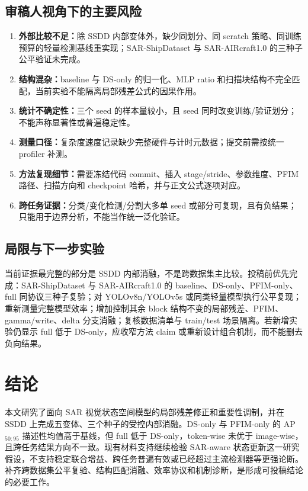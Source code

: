 \documentclass[UTF8,12pt,a4paper]{ctexart}
\begin{document}
\subsection{审稿人视角下的主要风险}
\begin{enumerate}
\item \textbf{外部比较不足：}除 SSDD 内部变体外，缺少同划分、同 scratch 策略、同训练预算的轻量检测基线重实现；SAR-ShipDataset 与 SAR-AIRcraft1.0 的三种子公平验证未完成。
\item \textbf{结构混杂：}baseline 与 DS-only 的归一化、MLP ratio 和扫描块结构不完全匹配，当前实验不能隔离局部残差公式的因果作用。
\item \textbf{统计不确定性：}三个 seed 的样本量较小，且 seed 同时改变训练/验证划分；不能声称显著性或普遍稳定性。
\item \textbf{测量口径：}复杂度速度记录缺少完整硬件与计时元数据；提交前需按统一 profiler 补测。
\item \textbf{方法复现细节：}需要冻结代码 commit、插入 stage/stride、参数维度、PFIM 路径、扫描方向和 checkpoint 哈希，并与正文公式逐项对应。
\item \textbf{跨任务证据：}分类/变化检测/分割大多单 seed 或部分可复现，且有负结果；只能用于边界分析，不能当作统一泛化验证。
\end{enumerate}

\subsection{局限与下一步实验}
当前证据最完整的部分是 SSDD 内部消融，不是跨数据集主比较。投稿前优先完成：SAR-ShipDataset 与 SAR-AIRcraft1.0 的 baseline、DS-only、PFIM-only、full 同协议三种子复验；对 YOLOv8n/YOLOv5s 或同类轻量模型执行公平复现；重新测量完整模型效率；增加控制其余 block 结构不变的局部残差、PFIM、gamma/write、delta 分支消融；复核数据清单与 train/test 场景隔离。若新增实验仍显示 full 低于 DS-only，应收窄方法 claim 或重新设计组合机制，而不能删去负向结果。

\section{结论}
本文研究了面向 SAR 视觉状态空间模型的局部残差修正和重要性调制，并在 SSDD 上完成五变体、三个种子的受控内部消融。DS-only 与 PFIM-only 的 AP$_{50:95}$ 描述性均值高于基线，但 full 低于 DS-only，token-wise 未优于 image-wise，且跨任务结果方向不一致。现有材料支持继续检验 SAR-aware 状态更新这一研究假设，不支持稳定联合增益、跨任务普遍有效或已经超过主流检测器等更强论断。补齐跨数据集公平复验、结构匹配消融、效率协议和机制诊断，是形成可投稿结论的必要工作。
\end{document}
